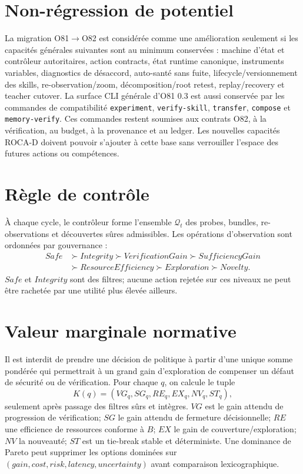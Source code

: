 \documentclass[11pt,a4paper]{report}
\begin{document}
\section{Non-régression de potentiel}
La migration O81\(\rightarrow\)O82 est considérée comme une amélioration seulement si les capacités générales suivantes sont au minimum conservées : machine d'état et contrôleur autoritaires, action contracts, état runtime canonique, instruments variables, diagnostics de désaccord, auto-santé sans fuite, lifecycle/versionnement des skills, re-observation/zoom, décomposition/root retest, replay/recovery et teacher cutover. La surface CLI générale d'O81 0.3 est aussi conservée par les commandes de compatibilité \texttt{experiment}, \texttt{verify-skill}, \texttt{transfer}, \texttt{compose} et \texttt{memory-verify}. Ces commandes restent soumises aux contrats O82, à la vérification, au budget, à la provenance et au ledger. Les nouvelles capacités ROCA-D doivent pouvoir s'ajouter à cette base sans verrouiller l'espace des futures actions ou compétences.

\section{Règle de contrôle}
À chaque cycle, le contrôleur forme l'ensemble $\mathcal Q_t$ des probes, bundles, re-observations et découvertes sûres admissibles. Les opérations d'observation sont ordonnées par gouvernance :
\[
\begin{aligned}
Safe &\succ Integrity \succ VerificationGain \succ SufficiencyGain \\
&\succ ResourceEfficiency \succ Exploration \succ Novelty.
\end{aligned}
\]
$Safe$ et $Integrity$ sont des filtres; aucune action rejetée sur ces niveaux ne peut être rachetée par une utilité plus élevée ailleurs.

\section{Valeur marginale normative}
Il est interdit de prendre une décision de politique à partir d'une unique somme pondérée qui permettrait à un grand gain d'exploration de compenser un défaut de sécurité ou de vérification. Pour chaque $q$, on calcule le tuple
\[
K(q)=(VG_q,SG_q,RE_q,EX_q,NV_q,ST_q),
\]
seulement après passage des filtres sûrs et intègres. $VG$ est le gain attendu de progression de vérification; $SG$ le gain attendu de fermeture décisionnelle; $RE$ une efficience de ressources conforme à $B$; $EX$ le gain de couverture/exploration; $NV$ la nouveauté; $ST$ est un tie-break stable et déterministe. Une dominance de Pareto peut supprimer les options dominées sur $(gain,cost,risk,latency,uncertainty)$ avant comparaison lexicographique.
\end{document}
